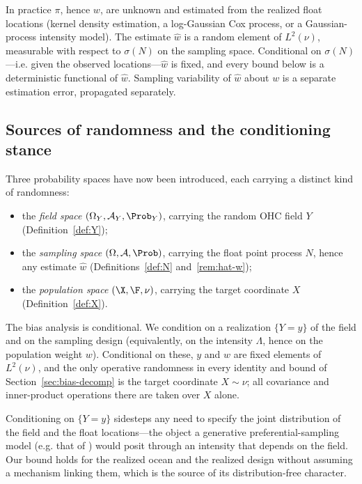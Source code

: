 \begin{remark}
\label{rem:hat-w}
In practice $\pi$, hence $w$, are unknown and estimated from the
realized float locations (kernel density estimation, a log-Gaussian Cox
process, or a Gaussian-process intensity model). The estimate $\hat w$
is a random element of $L^2(\nu)$, measurable with respect to
$\sigma(N)$ on the sampling space. Conditional on $\sigma(N)$---i.e.
given the observed locations---$\hat w$ is fixed, and every bound below
is a deterministic functional of $\hat w$. Sampling variability of
$\hat w$ about $w$ is a separate estimation error, propagated
separately.
\end{remark}

\subsection{Sources of randomness and the conditioning stance}
\label{sec:conditioning}

Three probability spaces have now been introduced, each carrying a
distinct kind of randomness:
\begin{itemize}
  \item the \emph{field space} $(\Omega_Y,\mathcal{A}_Y,\Prob_Y)$,
        carrying the random OHC field $Y$ (Definition~\ref{def:Y});
  \item the \emph{sampling space} $(\Omega,\mathcal{A},\Prob)$,
        carrying the float point process $N$, hence any estimate
        $\hat w$ (Definitions~\ref{def:N} and~\ref{rem:hat-w});
  \item the \emph{population space} $(\X,\F,\nu)$, carrying the target
        coordinate $X$ (Definition~\ref{def:X}).
\end{itemize}

The bias analysis is conditional. We condition on a realization
$\{Y=y\}$ of the field and on the sampling design (equivalently, on the
intensity $\Lambda$, hence on the population weight $w$). Conditional on
these, $y$ and $w$ are fixed elements of $L^2(\nu)$, and the only
operative randomness in every identity and bound of
Section~\ref{sec:bias-decomp} is the target coordinate $X\sim\nu$; all
covariance and inner-product operations there are taken over $X$ alone.

\begin{remark}
\label{rem:no-joint}
Conditioning on $\{Y=y\}$ sidesteps any need to specify the joint distribution
of the field and the float locations---the object a generative
preferential-sampling model (e.g. that of \citet{diggle2010}) would
posit through an intensity that depends on the field. Our bound holds
for the realized ocean and the realized design without assuming a
mechanism linking them, which is the source of its distribution-free
character.
\end{remark}


